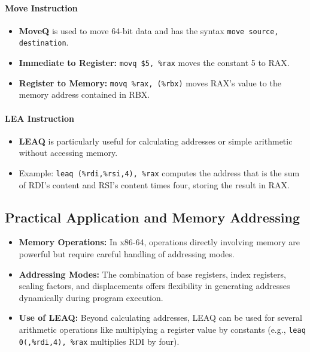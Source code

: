\documentclass{article}
\begin{document}
\paragraph{Move Instruction}

\begin{itemize}
  \item \textbf{MoveQ} is used to move 64-bit data and has the syntax \texttt{move source, destination}.
  \item \textbf{Immediate to Register:} \texttt{movq \$5, \%rax} moves the constant 5 to RAX.
  \item \textbf{Register to Memory:} \texttt{movq \%rax, (\%rbx)} moves RAX's value to the memory address contained in RBX.
\end{itemize}

\paragraph{LEA Instruction}

\begin{itemize}
  \item \textbf{LEAQ} is particularly useful for calculating addresses or simple arithmetic without accessing memory.
  \item Example: \texttt{leaq (\%rdi,\%rsi,4), \%rax} computes the address that is the sum of RDI’s content and RSI’s content times four, storing the result in RAX.
\end{itemize}

\subsection{Practical Application and Memory Addressing}

\begin{itemize}
  \item \textbf{Memory Operations:} In x86-64, operations directly involving memory are powerful but require careful handling of addressing modes.
  \item \textbf{Addressing Modes:} The combination of base registers, index registers, scaling factors, and displacements offers flexibility in generating addresses dynamically during program execution.
  \item \textbf{Use of LEAQ:} Beyond calculating addresses, LEAQ can be used for several arithmetic operations like multiplying a register value by constants (e.g., \texttt{leaq 0(,\%rdi,4), \%rax} multiplies RDI by four).
\end{itemize}
\end{document}
